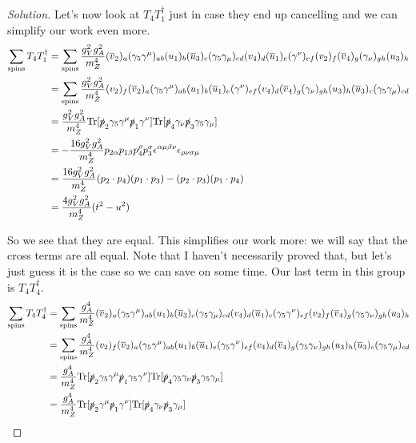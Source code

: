 \documentclass[12pt]{article}
\newenvironment{solution}{\begin{proof}[Solution]}{\end{proof}}
\begin{document}
\begin{solution}
Let's now look at $T_4T_1^\dagger$ just in case they end up cancelling and we can simplify our work even more.
\begin{align*}
    \sum_\text{spins}T_4T_1^\dagger&=\sum_\text{spins}\frac{g_V^2g_A^2}{m_Z^4}(\overline{v}_2)_a (\gamma_5\gamma^\mu)_{ab}(u_1)_b (\overline{u}_3)_c (\gamma_5\gamma_\mu)_{cd} (v_4)_d (\overline{u}_1)_e (\gamma^\nu)_{ef}(v_2)_f (\overline{v}_4)_g (\gamma_\nu)_{gh} (u_3)_h \\
    &= \sum_\text{spins}\frac{g_V^2g_A^2}{m_Z^4}(v_2)_f(\overline{v}_2)_a (\gamma_5\gamma^\mu)_{ab}(u_1)_b(\overline{u}_1)_e (\gamma^\nu)_{ef}(v_4)_d(\overline{v}_4)_g (\gamma_\nu)_{gh} (u_3)_h(\overline{u}_3)_c (\gamma_5\gamma_\mu)_{cd} \\
    &=\frac{g_V^2g_A^2}{m_Z^4}\text{Tr}[\slashed{p}_2\gamma_5\gamma^\mu\slashed{p}_1\gamma^\nu]\text{Tr}[\slashed{p}_4\gamma_\nu\slashed{p}_3\gamma_5\gamma_\mu] \\
    &= -\frac{16g_V^2g_A^2}{m_Z^4}p_{2\alpha}p_{1\beta}p_4^\rho p_3^\sigma \epsilon^{\alpha\mu\beta\nu}\epsilon_{\rho\nu\sigma\mu} \\
    &= \frac{16g_V^2g_A^2}{m_Z^4}(p_2\cdot p_4)(p_1 \cdot p_3)-(p_2\cdot p_3)(p_1 \cdot p_4) \\
    &= \frac{4g_V^2g_A^2}{m_Z^4}(t^2-u^2)
\end{align*}

So we see that they are equal. This simplifies our work more: we will say that the cross terms are all equal. Note that I haven't necessarily proved that, but let's just guess it is the case so we can save on some time. Our last term in this group is $T_4T_4^\dagger$.
\begin{align*}
    \sum_\text{spins}T_4T_4^\dagger&=\sum_\text{spins}\frac{g_A^4}{m_Z^4}(\overline{v}_2)_a (\gamma_5\gamma^\mu)_{ab}(u_1)_b (\overline{u}_3)_c (\gamma_5\gamma_\mu)_{cd} (v_4)_d (\overline{u}_1)_e (\gamma_5\gamma^\nu)_{ef}(v_2)_f (\overline{v}_4)_g (\gamma_5\gamma_\nu)_{gh} (u_3)_h \\
    &= \sum_\text{spins}\frac{g_A^4}{m_Z^4}(v_2)_f(\overline{v}_2)_a (\gamma_5\gamma^\mu)_{ab}(u_1)_b(\overline{u}_1)_e (\gamma_5\gamma^\nu)_{ef}(v_4)_d(\overline{v}_4)_g (\gamma_5\gamma_\nu)_{gh} (u_3)_h(\overline{u}_3)_c (\gamma_5\gamma_\mu)_{cd}\\
    &=\frac{g_A^4}{m_Z^4}\text{Tr}[\slashed{p}_2\gamma_5\gamma^\mu\slashed{p}_1\gamma_5\gamma^\nu]\text{Tr}[\slashed{p}_4\gamma_5\gamma_\nu\slashed{p}_3\gamma_5\gamma_\mu] \\
    &= \frac{g_A^4}{m_Z^4}\text{Tr}[\slashed{p}_2\gamma^\mu\slashed{p}_1\gamma^\nu]\text{Tr}[\slashed{p}_4\gamma_\nu\slashed{p}_3\gamma_\mu]
\end{align*}


\end{solution}
\end{document}
